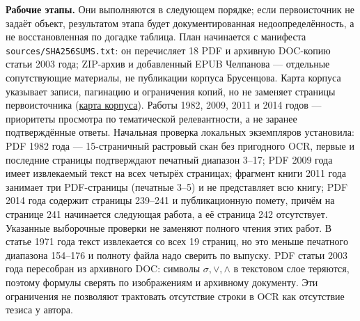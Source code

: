 \documentclass[12pt,a4paper]{article}
\begin{document}
\textbf{Рабочие этапы.} Они выполняются в следующем порядке; если первоисточник не задаёт объект, результатом этапа будет документированная недоопределённость, а не восстановленная по догадке таблица. План начинается с манифеста \texttt{sources/SHA256SUMS.txt}: он перечисляет 18 PDF и архивную DOC-копию статьи 2003 года; ZIP-архив и добавленный EPUB Челпанова — отдельные сопутствующие материалы, не публикации корпуса Брусенцова. Карта корпуса указывает записи, пагинацию и ограничения копий, но не заменяет страницы первоисточника (\href{Карта-работ-Брусенцова.tex}{карта корпуса}). Работы 1982, 2009, 2011 и 2014 годов — приоритеты просмотра по тематической релевантности, а не заранее подтверждённые ответы. Начальная проверка локальных экземпляров установила: PDF 1982 года — 15-страничный растровый скан без пригодного OCR, первые и последние страницы подтверждают печатный диапазон 3–17; PDF 2009 года имеет извлекаемый текст на всех четырёх страницах; фрагмент книги 2011 года занимает три PDF-страницы (печатные 3–5) и не представляет всю книгу; PDF 2014 года содержит страницы 239–241 и публикационную помету, причём на странице 241 начинается следующая работа, а её страница 242 отсутствует. Указанные выборочные проверки не заменяют полного чтения этих работ. В статье 1971 года текст извлекается со всех 19 страниц, но это меньше печатного диапазона 154–176 и полноту файла надо сверить по выпуску. PDF статьи 2003 года пересобран из архивного DOC: символы \(\sigma,\lor,\land\) в текстовом слое теряются, поэтому формулы сверять по изображениям и архивному документу. Эти ограничения не позволяют трактовать отсутствие строки в OCR как отсутствие тезиса у автора.
\end{document}
